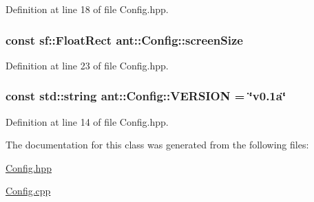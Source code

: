 Definition at line 18 of file Config.\+hpp.

\hypertarget{classant_1_1_config_a84b340cf79c14165c4960a4ea0ff56e0}{
\subsubsection[{screen\+Size}]{\setlength{\rightskip}{0pt plus 5cm}const sf\+::\+Float\+Rect ant\+::\+Config\+::screen\+Size\hspace{0.3cm}{\ttfamily [static]}}}\label{classant_1_1_config_a84b340cf79c14165c4960a4ea0ff56e0}


Definition at line 23 of file Config.\+hpp.

\hypertarget{classant_1_1_config_a9f3ed4719932faa38daf63c821959c0f}{
\subsubsection[{V\+E\+R\+S\+I\+O\+N}]{\setlength{\rightskip}{0pt plus 5cm}const std\+::string ant\+::\+Config\+::\+V\+E\+R\+S\+I\+O\+N = \char`\"{}v0.\+1a\char`\"{}\hspace{0.3cm}{\ttfamily [static]}}}\label{classant_1_1_config_a9f3ed4719932faa38daf63c821959c0f}


Definition at line 14 of file Config.\+hpp.



The documentation for this class was generated from the following files\+:\begin{DoxyCompactItemize}
\item 
\hyperlink{_config_8hpp}{Config.\+hpp}\item 
\hyperlink{_config_8cpp}{Config.\+cpp}\end{DoxyCompactItemize}
